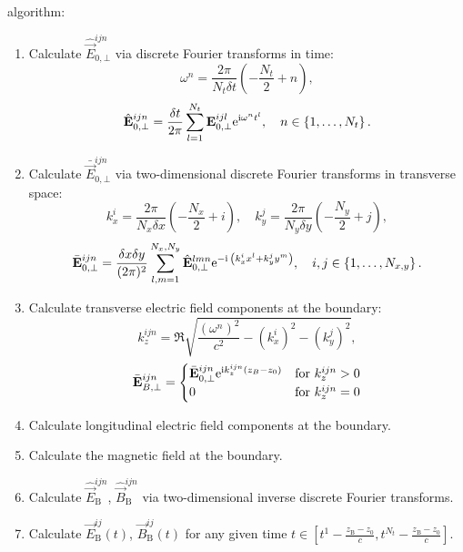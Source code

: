 algorithm:
\begin{enumerate}
	\item Calculate $ \hat{\vec{E}}_{0, \bot}^{ijn} $ via discrete Fourier transforms in time:
	\begin{equation}
	\omega^n = \frac{2 \pi}{N_t \delta t} \left( -\frac{N_t}{2} + n \right),
	\end{equation}
	\begin{equation}
	\hat{\mathbf{E}}_{0, \bot}^{ijn} = \frac{\delta t}{2 \pi} \sum_{l=1}^{N_t} \mathbf{E}_{0, \bot}^{ijl} \mathrm{e}^{\mathrm{i} \omega^n t^l}, \quad n \in \left\lbrace 1, \dots, N_t \right\rbrace.
	\end{equation}
	\item Calculate $ \bar{\vec{E}}_{0, \bot}^{ijn} $ via two-dimensional discrete Fourier transforms in transverse space:
	\begin{equation}
	k_x^i = \frac{2 \pi}{N_x \delta x} \left( - \frac{N_x}{2} + i\right), \quad k_y^j = \frac{2 \pi}{N_y \delta y} \left( - \frac{N_y}{2} + j\right),
	\end{equation}
	\begin{equation}
	\bar{\mathbf{E}}_{0, \bot}^{ijn} = \frac{\delta x \delta y}{(2 \pi)^2} \sum_{l, m = 1}^{N_x, N_y} \hat{\mathbf{E}}_{0, \bot}^{lmn} \mathrm{e}^{- \mathrm{i} \: \left(k_x^i x^l + k_y^j y^m \right)}, \quad i, j \in \left\lbrace 1, \dots, N_{x, y} \right\rbrace.
	\end{equation}
	\item Calculate transverse electric field components at the boundary:
	\begin{equation}
	k_z^{ijn} = \Re \sqrt{\frac{(\omega^n)^2}{c^2} - (k_x^i)^2 - (k_y^j)^2},
	\end{equation}
	\begin{equation}
	\bar{\mathbf{E}}_{B, \bot}^{ijn} =
	\begin{cases}
	\bar{\mathbf{E}}_{0, \bot}^{ijn} \mathrm{e}^{\mathrm{i} k_z^{ijn}(z_B - z_0)} & \text{for} \ k_z^{ijn} > 0 \\
	0							 							   & \text{for} \  k_z^{ijn} = 0 
	\end{cases}
	\end{equation}
	\item Calculate longitudinal electric field components at the boundary.
	\item Calculate the magnetic field at the boundary.
	\item Calculate $ \hat{\vec{E}}_{\mathrm{B}}^{ijn} $, $ \hat{\vec{B}}_{\mathrm{B}}^{ijn} $ via two-dimensional inverse discrete Fourier transforms.
	\item Calculate $ \vec{E}_{\mathrm{B}}^{ij}(t) $, $ \vec{B}_{\mathrm{B}}^{ij}(t) $ for any given time $ t \in [t^{1} - \frac{z_{\mathrm{B}} - z_{0}}{c}, t^{N_{t}}  - \frac{z_{\mathrm{B}} - z_{0}}{c}] $.
\end{enumerate}

